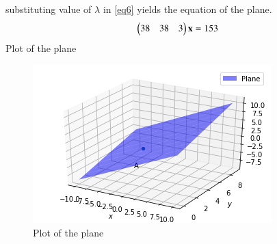 \documentclass[journal,12pt,twocolumn]{IEEEtran}
\begin{document}
substituting value of $\lambda$ in \eqref{eq6} yields the equation of the plane.
\begin{align}
\begin{pmatrix}38 & 38 & 3\end{pmatrix}\mathbf{x}=153
\end{align}
Plot of the plane 
\begin{figure}[ht]
\centering
\includegraphics[width=\columnwidth]{Figure.png}
\caption{Plot of the plane}
\label{Plot of the plane}
\end{figure}
\end{document}
